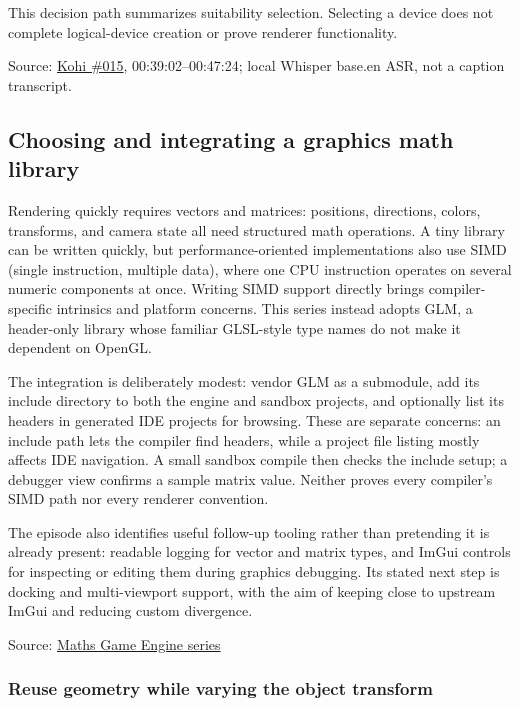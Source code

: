 This decision path summarizes suitability selection. Selecting a device does not complete logical-device creation or prove renderer functionality.

Source: \href{https://www.youtube.com/watch?v=6Kj3O2Ov1RU}{Kohi \#015}, 00:39:02--00:47:24; local Whisper base.en ASR, not a caption transcript.

\subsection{Choosing and integrating a graphics math library}\label{06-engine-ii-ch025-choosing-and-integrating-a-graphics-math-library}

\hypertarget{06-engine-ii-ch025-choosing-and-integrating-a-graphics-math-library}{}

Rendering quickly requires vectors and matrices: positions, directions, colors, transforms, and camera state all need structured math operations. A tiny library can be written quickly, but performance-oriented implementations also use SIMD (single instruction, multiple data), where one CPU instruction operates on several numeric components at once. Writing SIMD support directly brings compiler-specific intrinsics and platform concerns. This series instead adopts GLM, a header-only library whose familiar GLSL-style type names do not make it dependent on OpenGL.

The integration is deliberately modest: vendor GLM as a submodule, add its include directory to both the engine and sandbox projects, and optionally list its headers in generated IDE projects for browsing. These are separate concerns: an include path lets the compiler find headers, while a project file listing mostly affects IDE navigation. A small sandbox compile then checks the include setup; a debugger view confirms a sample matrix value. Neither proves every compiler's SIMD path nor every renderer convention.

The episode also identifies useful follow-up tooling rather than pretending it is already present: readable logging for vector and matrix types, and ImGui controls for inspecting or editing them during graphics debugging. Its stated next step is docking and multi-viewport support, with the aim of keeping close to upstream ImGui and reducing custom divergence.

Source: \href{https://www.youtube.com/watch?v=Idr1G1KyPNg}{Maths \textbar{} Game Engine series}

\subsubsection{Reuse geometry while varying the object transform}\label{06-engine-ii-ch025-reuse-geometry-while-varying-the-object-transform}

